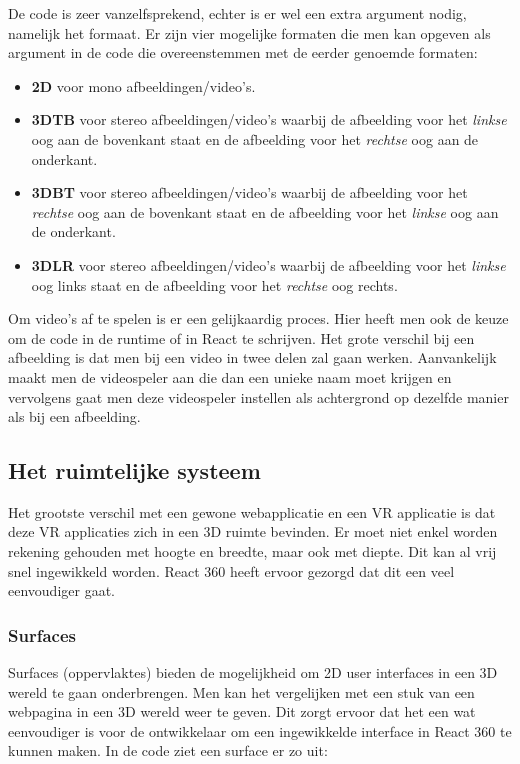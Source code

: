 De code is zeer vanzelfsprekend, echter is er wel een extra argument nodig, namelijk het formaat. Er zijn vier mogelijke formaten die men kan opgeven als argument in de code die overeenstemmen met de eerder genoemde formaten:

\begin{itemize}
	\item \textbf{2D} voor mono afbeeldingen/video's.
	\item \textbf{3DTB} voor stereo afbeeldingen/video's waarbij de afbeelding voor het \textit{linkse} oog  aan de bovenkant staat en de afbeelding voor het \textit{rechtse} oog aan de onderkant.
	\item \textbf{3DBT} voor stereo afbeeldingen/video's waarbij de afbeelding voor het \textit{rechtse} oog aan de bovenkant staat en de afbeelding voor het \textit{linkse} oog aan de onderkant.
	\item \textbf{3DLR} voor stereo afbeeldingen/video's waarbij de afbeelding voor het \textit{linkse} oog links staat en de afbeelding voor het \textit{rechtse} oog rechts.
\end{itemize}

Om video's af te spelen is er een gelijkaardig proces. Hier heeft men ook de keuze om de code in de runtime of in React te schrijven. Het grote verschil bij een afbeelding is dat men bij een video in twee delen zal gaan werken. Aanvankelijk maakt men de videospeler aan die dan een unieke naam moet krijgen en vervolgens gaat men deze videospeler instellen als achtergrond op dezelfde manier als bij een afbeelding.

\subsection{Het ruimtelijke systeem}
\label{subsec:ruimtelijk-systeem}
Het grootste verschil met een gewone webapplicatie en een VR applicatie is dat deze VR applicaties zich in een 3D ruimte bevinden. Er moet niet enkel worden rekening gehouden met hoogte en breedte, maar ook met diepte. Dit kan al vrij snel ingewikkeld worden. React 360 heeft ervoor gezorgd dat dit een veel eenvoudiger gaat.

\subsubsection{Surfaces}
\label{ssubsec:surfaces}
Surfaces (oppervlaktes) bieden de mogelijkheid om 2D user interfaces in een 3D wereld te gaan onderbrengen. Men kan het vergelijken met een stuk van een webpagina in een 3D wereld weer te geven. Dit zorgt ervoor dat het een wat eenvoudiger is voor de ontwikkelaar om een ingewikkelde interface in React 360 te kunnen maken. In de code ziet een surface er zo uit:

